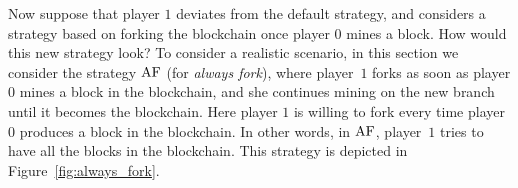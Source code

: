 Now suppose that player $1$ deviates from the default strategy, and considers a strategy based on forking the blockchain once player $0$ mines a block. 
How would this new strategy look? To consider a realistic scenario, in this section we 
%
%
consider the strategy $\text{\rm AF}$ (for \emph{always fork}), where player~$1$ forks as soon as player $0$ mines a block in the blockchain, and she continues mining on the new branch until it becomes the blockchain. Here player $1$ is willing to fork every time player $0$ produces a block in the blockchain. In other words, 
in $\text{\rm AF}$, player~$1$ tries to have all the blocks in the blockchain. This strategy is depicted in Figure~\ref{fig:always_fork}.

